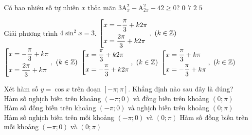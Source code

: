 \begin{ex}%
Có bao nhiêu số tự nhiên $x$ thỏa mãn $3\mathrm{A}_x^2-\mathrm{A}_{2x}^2+42\ge 0$?
	\choice
	{$0$}
	{$7$}
	{$2$}
	{\True $5$}
\end{ex}

\begin{ex}%
Giải phương trình $4\sin^2 x=3$.
	\choice
	{$\left[\begin{aligned}&x=-\dfrac{\pi}{3}+k2\pi\\ &x=\dfrac{2\pi}{3}+k2\pi\end{aligned}\right.,\ (k\in\mathbb{Z})$}
	{$\left[\begin{aligned}&x=-\dfrac{\pi}{3}+k\pi\\ &x=\dfrac{2\pi}{3}+k\pi\end{aligned}\right.,\ (k\in\mathbb{Z})$}
	{$\left[\begin{aligned}&x=\dfrac{\pi}{3}+k2\pi\\ &x=-\dfrac{\pi}{3}+k2\pi\end{aligned}\right.,\ (k\in\mathbb{Z})$}
	{\True $\left[\begin{aligned}&x=\dfrac{\pi}{3}+k\pi\\ &x=-\dfrac{\pi}{3}+k\pi\end{aligned}\right.,\ (k\in\mathbb{Z})$}
\end{ex}

\begin{ex}%
Xét hàm số $y=\cos x$ trên đoạn $[-\pi;\pi]$. Khẳng định nào sau đây là đúng?
	\choice
	{\True Hàm số nghịch biến trên khoảng $(-\pi;0)$ và đồng biến trên khoảng $(0;\pi)$}
	{Hàm số đồng biến trên khoảng $(-\pi;0)$ và nghịch biến trên khoảng $(0;\pi)$}
	{Hàm số nghịch biến trên mỗi khoảng $(-\pi;0)$ và $(0;\pi)$}
	{Hàm số đồng biến trên mỗi khoảng $(-\pi;0)$ và $(0;\pi)$}
\end{ex}

